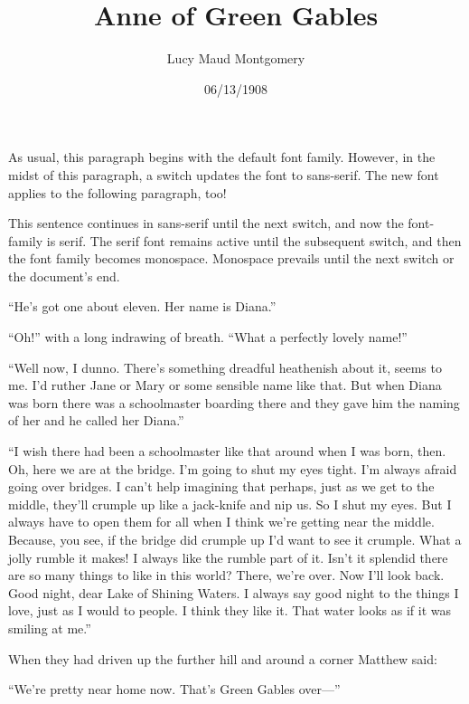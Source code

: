 \documentclass[a4paper]{article}
\title{Anne of Green Gables}
\author{Lucy Maud Montgomery}
\date{06/13/1908}
\begin{document}
\maketitle

As usual, this paragraph begins with the default font family. However, in the midst of this paragraph, \sffamily a switch updates the font to sans-serif. The new font applies to the following paragraph, too!

This sentence continues in sans-serif until \rmfamily the next switch, and now the font-family is serif. The serif font remains active until \ttfamily the subsequent switch, and then the font family becomes monospace. Monospace prevails until the next switch or the document's end.

\sffamily ``He's got one about eleven. Her name is Diana.''

``Oh!'' with a long indrawing of breath. ``What a perfectly lovely name!''

\rmfamily ``Well now, I dunno. There's something dreadful heathenish about it, seems to me. I'd ruther Jane or Mary or some sensible name like that. But when Diana was born there was a schoolmaster boarding there and they gave him the naming of her and he called her Diana.''

``I wish there had been a schoolmaster like that around when I was born, then. Oh, here we are at the bridge. I'm going to shut my eyes tight. I'm always afraid going over bridges. I can't help imagining that perhaps, just as we get to the middle, they'll crumple up like a jack-knife and nip us. So I shut my eyes. But I always have to open them for all when I think we're getting near the middle. Because, you see, if the bridge did crumple up I'd want to see it crumple. What a jolly rumble it makes! I always like the rumble part of it. Isn't it splendid there are so many things to like in this world? There, we're over. Now I'll look back. Good night, dear Lake of Shining Waters. I always say good night to the things I love, just as I would to people. I think they like it. That water looks as if it was smiling at me.''

\ttfamily When they had driven up the further hill and around a corner Matthew said:

``We're pretty near home now. That's Green Gables over---''
\end{document}
